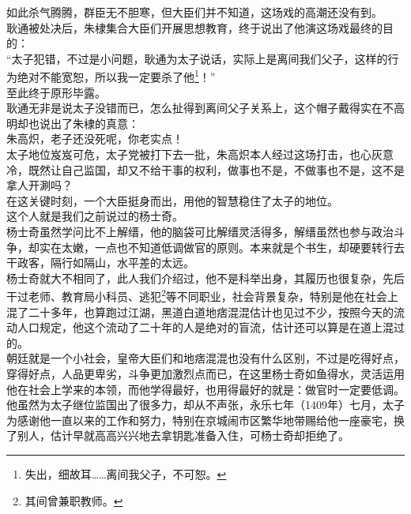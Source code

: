 \begin{multicols}{\theparacolNo}
如此杀气腾腾，群臣无不胆寒，但大臣们并不知道，这场戏的高潮还没有到。\\

耿通被处决后，朱棣集合大臣们开展思想教育，终于说出了他演这场戏最终的目的：\\

“太子犯错，不过是小问题，耿通为太子说话，实际上是离间我们父子，这样的行为绝对不能宽恕，所以我一定要杀了他\footnote{失出，细故耳……离间我父子，不可恕。}！”\\

至此终于原形毕露。\\

耿通无非是说太子没错而已，怎么扯得到离间父子关系上，这个帽子戴得实在不高明却也说出了朱棣的真意：\\

朱高炽，老子还没死呢，你老实点！\\

太子地位岌岌可危，太子党被打下去一批，朱高炽本人经过这场打击，也心灰意冷，既然让自己监国，却又不给干事的权利，做事也不是，不做事也不是，这不是拿人开涮吗？\\

在这关键时刻，一个大臣挺身而出，用他的智慧稳住了太子的地位。\\

这个人就是我们之前说过的杨士奇。\\

杨士奇虽然学问比不上解缙，他的脑袋可比解缙灵活得多，解缙虽然也参与政治斗争，却实在太嫩，一点也不知道低调做官的原则。本来就是个书生，却硬要转行去干政客，隔行如隔山，水平差的太远。\\

杨士奇就大不相同了，此人我们介绍过，他不是科举出身，其履历也很复杂，先后干过老师、教育局小科员、逃犯\footnote{其间曾兼职教师。}等不同职业，社会背景复杂，特别是他在社会上混了二十多年，也算跑过江湖，黑道白道地痞混混估计也见过不少，按照今天的流动人口规定，他这个流动了二十年的人是绝对的盲流，估计还可以算是在道上混过的。\\

朝廷就是一个小社会，皇帝大臣们和地痞混混也没有什么区别，不过是吃得好点，穿得好点，人品更卑劣，斗争更加激烈点而已，在这里杨士奇如鱼得水，灵活运用他在社会上学来的本领，而他学得最好，也用得最好的就是：做官时一定要低调。\\

他虽然为太子继位监国出了很多力，却从不声张，永乐七年（1409年）七月，太子为感谢他一直以来的工作和努力，特别在京城闹市区繁华地带赐给他一座豪宅，换了别人，估计早就高高兴兴地去拿钥匙准备入住，可杨士奇却拒绝了。\\


\end{multicols}
